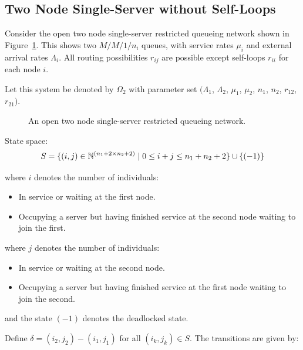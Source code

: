 \documentclass{article}
\numberwithin{equation}{section}
\begin{document}
\subsection{Two Node Single-Server without Self-Loops}\label{sec:2nodewithoutselfloops}

Consider the open two node single-server restricted queueing network shown in Figure~\ref{fig:queueingnetwork_2nodes}.
This shows two \(M/M/1/n_i\) queues, with service rates $\mu_i$ and external arrival rates $\Lambda_i$.
All routing possibilities $r_{ij}$ are possible except self-loops $r_{ii}$ for each node $i$.

Let this system be denoted by $\Omega_2$ with parameter set $(\Lambda_1$, $\Lambda_2$, $\mu_1$, $\mu_2$, $n_1$, $n_2$, $r_{12}$, $r_{21})$.

\begin{figure}[!htbp]
  \begin{center}
  
  \end{center}
  \caption{An open two node single-server restricted queueing network.}
  \label{fig:queueingnetwork_2nodes}
\end{figure}

State space:
    \[S = \{(i,j)\in\mathbb{N}^{(n_1+2\times n_2+2)} \nonscript\; | \nonscript\; 0 \leq i + j \leq n_1 + n_2 + 2
    \}\cup\{(-1)\}\]

    where \(i\) denotes the number of individuals:
        \begin{itemize}
            \item In service or waiting at the first node.
            \item Occupying a server but having finished service at the
                second node waiting to join the first.
        \end{itemize}
    where \(j\) denotes the number of individuals:
        \begin{itemize}
            \item In service or waiting at the second node.
            \item Occupying a server but having finished service at the
                first node waiting to join the second.
        \end{itemize}
    and the state $(-1)$ denotes the deadlocked state.

Define $\delta = (i_2, j_2) - (i_1, j_1)$ for all $(i_k, j_k) \in S$. The transitions are given by:
\end{document}
